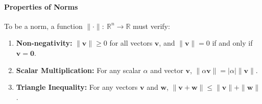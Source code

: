 \documentclass[]{article}
\newcommand{\R}{\mathbb{R}}
\begin{document}
	\paragraph{Properties of Norms}
	To be a norm, a function $\| \cdot \|: \ \R^n \to \R$ must verify:
	\begin{enumerate}
		\item \textbf{Non-negativity:}
		$\|\mathbf{v}\| \geq 0$ for all vectors $\mathbf{v}$, and $\|\mathbf{v}\| = 0$ if and only if $\mathbf{v} = \mathbf{0}$.
		\item \textbf{Scalar Multiplication:}
		For any scalar $\alpha$ and vector $\mathbf{v}$, $\|\alpha \mathbf{v}\| = |\alpha| \|\mathbf{v}\|$.
		\item \textbf{Triangle Inequality:}
		For any vectors $\mathbf{v}$ and $\mathbf{w}$, $\|\mathbf{v} + \mathbf{w}\| \leq \|\mathbf{v}\| + \|\mathbf{w}\|$.
	\end{enumerate}
	
	
\end{document}
